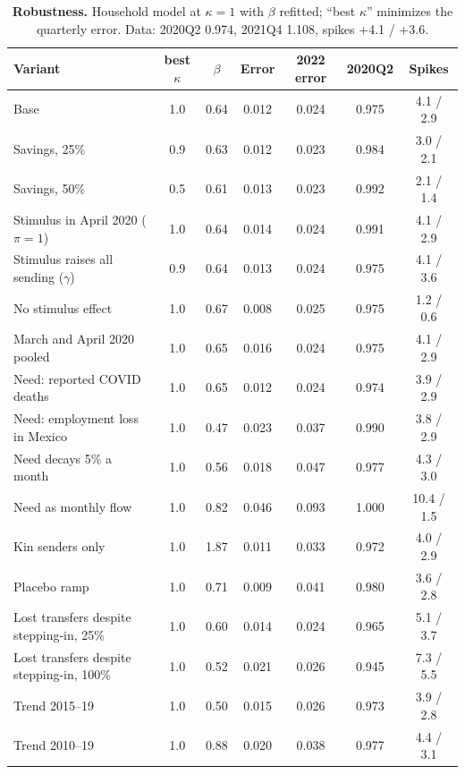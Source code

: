 \documentclass[11pt]{article}
\begin{document}
\begin{table}[t]
\centering
\small
\begin{threeparttable}
\caption{\textbf{Robustness.} Household model at $\kappa = 1$ with $\beta$ refitted; ``best $\kappa$'' minimizes the quarterly error. Data: 2020Q2 0.974, 2021Q4 1.108, spikes +4.1 / +3.6.}
\label{tab:robust}
\begin{tabular}{lcccccc}
\toprule
Variant & best $\kappa$ & $\beta$ & Error & 2022 error & 2020Q2 & Spikes \\
\midrule
Base & 1.0 & 0.64 & 0.012 & 0.024 & 0.975 & 4.1 / 2.9 \\
\addlinespace
Savings, 25\% & 0.9 & 0.63 & 0.012 & 0.023 & 0.984 & 3.0 / 2.1 \\
Savings, 50\% & 0.5 & 0.61 & 0.013 & 0.023 & 0.992 & 2.1 / 1.4 \\
Stimulus in April 2020 ($\pi = 1$) & 1.0 & 0.64 & 0.014 & 0.024 & 0.991 & 4.1 / 2.9 \\
Stimulus raises all sending ($\gamma$) & 0.9 & 0.64 & 0.013 & 0.024 & 0.975 & 4.1 / 3.6 \\
No stimulus effect & 1.0 & 0.67 & 0.008 & 0.025 & 0.975 & 1.2 / 0.6 \\
March and April 2020 pooled\tnote{a} & 1.0 & 0.65 & 0.016 & 0.024 & 0.975 & 4.1 / 2.9 \\
\addlinespace
Need: reported COVID deaths & 1.0 & 0.65 & 0.012 & 0.024 & 0.974 & 3.9 / 2.9 \\
Need: employment loss in Mexico & 1.0 & 0.47 & 0.023 & 0.037 & 0.990 & 3.8 / 2.9 \\
Need decays 5\% a month & 1.0 & 0.56 & 0.018 & 0.047 & 0.977 & 4.3 / 3.0 \\
Need as monthly flow & 1.0 & 0.82 & 0.046 & 0.093 & 1.000 & 10.4 / 1.5 \\
Kin senders only & 1.0 & 1.87 & 0.011 & 0.033 & 0.972 & 4.0 / 2.9 \\
Placebo ramp & 1.0 & 0.71 & 0.009 & 0.041 & 0.980 & 3.6 / 2.8 \\
\addlinespace
Lost transfers despite stepping-in, 25\% & 1.0 & 0.60 & 0.014 & 0.024 & 0.965 & 5.1 / 3.7 \\
Lost transfers despite stepping-in, 100\% & 1.0 & 0.52 & 0.021 & 0.026 & 0.945 & 7.3 / 5.5 \\
\addlinespace
Trend 2015--19 & 1.0 & 0.50 & 0.015 & 0.026 & 0.973 & 3.9 / 2.8 \\
Trend 2010--19 & 1.0 & 0.88 & 0.020 & 0.038 & 0.977 & 4.4 / 3.1 \\
\bottomrule
\end{tabular}

\end{threeparttable}
\end{table}
\end{document}
